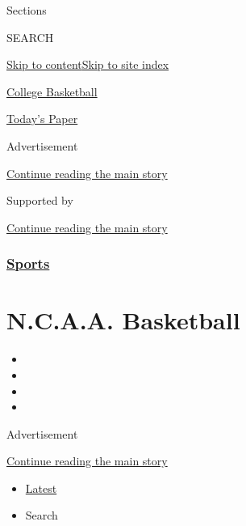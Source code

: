 Sections

SEARCH

\protect\hyperlink{site-content}{Skip to
content}\protect\hyperlink{site-index}{Skip to site index}

\href{https://www.nytimes3xbfgragh.onion/section/sports/ncaabasketball}{College
Basketball}

\href{https://myaccount.nytimes3xbfgragh.onion/auth/login?response_type=cookie\&client_id=vi}{}

\href{https://www.nytimes3xbfgragh.onion/section/todayspaper}{Today's
Paper}

Advertisement

\protect\hyperlink{after-top}{Continue reading the main story}

Supported by

\protect\hyperlink{after-sponsor}{Continue reading the main story}

\hypertarget{sports}{%
\subsubsection{\texorpdfstring{\href{/section/sports}{Sports}}{Sports}}\label{sports}}

\hypertarget{ncaa-basketball}{%
\section{N.C.A.A. Basketball}\label{ncaa-basketball}}

\begin{itemize}
\item
\item
\item
\item
\end{itemize}

Advertisement

\protect\hyperlink{after-subheader}{Continue reading the main story}

\begin{itemize}
\tightlist
\item
  \protect\hyperlink{stream-panel}{Latest}
\item
  Search
\end{itemize}

